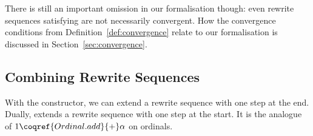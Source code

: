 There is still an important omission in our formalisation
though: even rewrite sequences satisfying
 are not necessarily
convergent. How the convergence conditions from
Definition~\ref{def:convergence} relate to our formalisation is
discussed in Section~\ref{sec:convergence}.


\subsection{Combining Rewrite Sequences}\label{sub:combining}

With the 
constructor, we can extend a rewrite sequence with one step at the
end. Dually,  extends
a rewrite sequence with one step at the start. It is the analogue of
$1 \coqref{Ordinal.add}{+} \alpha$ on ordinals.

